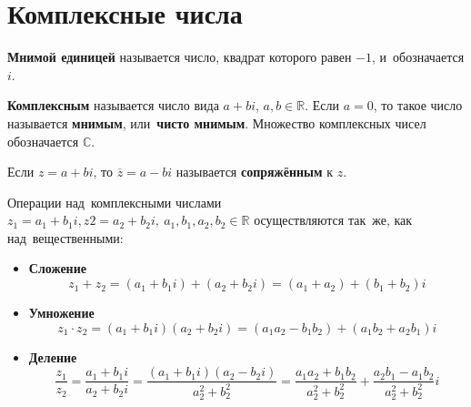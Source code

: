 \section{Комплексные числа}
\textbf{Мнимой единицей} называется число, квадрат которого равен $-1$, и~обозначается $i$.

\textbf{Комплексным} называется число вида $a + bi$, $a, b \in \mathbb R$.
Если $a = 0$, то такое число называется \textbf{мнимым}, или~\textbf{чисто мнимым}. Множество комплексных чисел обозначается $\mathbb C$.

Если $z = a + bi$, то $\overline z = a - bi$ называется \textbf{сопряжённым} к $z$.

Операции над~комплексными числами $z_1 = a_1 + b_1 i, z2 = a_2 + b_2 i, \ a_1, b_1, a_2, b_2 \in \mathbb R$ осуществляются так~же, как над~вещественными:
\begin{itemize}
	\item\textbf{Сложение}
	\begin{equation*}
	z_1 + z_2 = (a_1 + b_1 i) + (a_2 + b_2 i) = (a_1 + a_2) + (b_1 + b_2)i
	\end{equation*}
	
	\item\textbf{Умножение}
	\begin{equation*}
	z_1 \cdot z_2 = (a_1 + b_1 i)(a_2 + b_2 i) = (a_1 a_2 - b_1 b_2) + (a_1 b_2 + a_2 b_1)i
	\end{equation*}
	
	\item\textbf{Деление}
	\begin{equation*}
	\frac{z_1}{z_2} = \frac{a_1 + b_1 i}{a_2 + b_2 i} =
	\frac{(a_1 + b_1 i)(a_2 - b_2 i)}{a_2^2 + b_2^2} =
	\frac{a_1 a_2 + b_1 b_2}{a_2^2 + b_2^2} + \frac{a_2 b_1 - a_1 b_2}{a_2^2 + b_2^2} i
	\end{equation*}
\end{itemize}